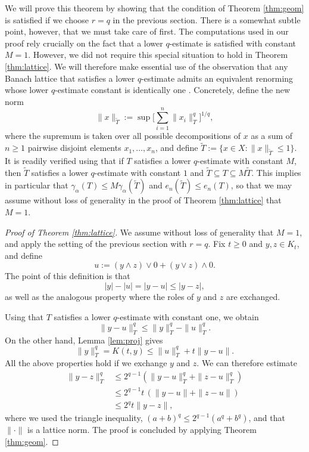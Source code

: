 \documentclass[10pt,reqno]{amsart}
\theoremstyle{definition}
\numberwithin{equation}{section}
\numberwithin{figure}{section}
\numberwithin{table}{section}
\begin{document}
We will prove this theorem by showing that the condition of Theorem 
\ref{thm:geom} is satisfied if we choose $r=q$ in the previous section.
There is a somewhat subtle point, however, that we must take care of 
first. The computations used in our proof rely crucially on the fact that 
a lower $q$-estimate is satisfied with constant $M=1$. However, we did not 
require this special situation to hold in Theorem \ref{thm:lattice}. We 
will therefore make essential use of the observation that any Banach 
lattice that satisfies a lower $q$-estimate admits an equivalent renorming 
whose lower $q$-estimate constant is identically one \cite[Lemma 
1.f.11]{LT79}. Concretely, define the new norm
$$
	\|x\|_{\tilde T} := \sup \Bigg[\sum_{i=1}^n\|x_i\|_T^q\Bigg]^{1/q},
$$
where the supremum is taken over all possible decompositions of $x$ as a 
sum of $n\ge 1$ pairwise disjoint elements $x_1,\ldots,x_n$, and define
$\tilde T:=\{x\in X:\|x\|_{\tilde T}\le 1\}$. It is readily verified 
using \cite[Proposition 1.f.6]{LT79} that 
if $T$ satisfies a lower $q$-estimate with constant $M$, then $\tilde T$ 
satisfies a lower $q$-estimate with constant $1$ and $\tilde T\subseteq 
T\subseteq M\tilde T$. This implies in particular that
$\gamma_\alpha(T)\le M\gamma_\alpha(\tilde T)$ and $e_n(\tilde T)\le 
e_n(T)$, so that we may assume without loss of generality in the proof of 
Theorem \ref{thm:lattice} that $M=1$.

\begin{proof}[Proof of Theorem \ref{thm:lattice}]
We assume without loss of generality that $M=1$, and apply the setting of 
the previous section with $r=q$. Fix $t\ge 0$ and $y,z\in K_t$, and define
$$
	u := (y\wedge z)\vee 0 + (y\vee z)\wedge 0.
$$
The point of this definition is that 
$$
	|y|-|u|=|y-u|\le|y-z|,
$$
as well as the analogous property where the roles of $y$ and $z$ are 
exchanged.

Using that $T$ satisfies a lower $q$-estimate 
with constant one, we obtain
$$
	\|y-u\|_T^q \le \|y\|_T^q-\|u\|_T^q.
$$
On the other hand, Lemma \ref{lem:proj} gives
$$
	\|y\|_T^q = K(t,y) \le \|u\|_T^q + t\|y-u\|.
$$
All the above properties hold if we exchange $y$ and $z$.
We can therefore estimate
\begin{align*}
	\|y-z\|_T^q &\le
	2^{q-1}(\|y-u\|_T^q + \|z-u\|_T^q) \\
	&\le
	2^{q-1}t\,(\|y-u\| + \|z-u\|) \\
	&\le
	2^q t\|y-z\|,
\end{align*}
where we used the triangle inequality, $(a+b)^q\le 2^{q-1}(a^q+b^q)$, and 
that $\|\cdot\|$ is a lattice norm.
The proof is concluded by applying Theorem \ref{thm:geom}.
\end{proof}
\end{document}
